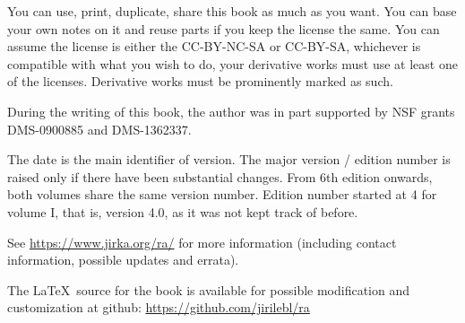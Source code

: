 \documentclass[12pt]{book}
\theoremstyle{plain}
\theoremstyle{remark}
\theoremstyle{definition}
\theoremstyle{exercise}
\theoremstyle{example}
\begin{document}
\bigskip

\noindent
You can use, print, duplicate, share this book as much as you want.  You can
base your own notes on it and reuse parts if you keep the license the
same.  You can assume the license is either the CC-BY-NC-SA or CC-BY-SA\@,
whichever is compatible with what you wish to do, your derivative works must
use at least one of the licenses.
Derivative works must be prominently marked as such.

\bigskip

\noindent
During the writing of this book, 
the author was in part supported by NSF grants DMS-0900885 and
DMS-1362337.

\bigskip

\noindent
The date is the main identifier of version.  The major version / edition
number is raised only if there have been substantial changes.
From 6th edition onwards, both volumes share the same version number.
Edition
number started at 4 for volume I, that is, version 4.0, as it was not kept track of
before.  %

\bigskip

\noindent
See \url{https://www.jirka.org/ra/} for more information
(including contact information, possible updates and errata).

\bigskip

\noindent
The \LaTeX\ source for the book is available
for possible modification and customization
at github: \url{https://github.com/jirilebl/ra}



\tableofcontents
{}

\newpage




\newcommand{\VolOneIntroExtrahead}{
\subsection{About Volume I}
}

\newcommand{\VolTwoIntro}{
\subsection{About Volume II}


}
\end{document}
